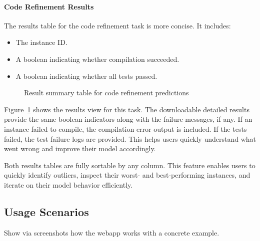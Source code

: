 \paragraph{Code Refinement Results}

The results table for the code refinement task is more concise. It includes:
\begin{itemize}
    \item The instance ID.
    \item A boolean indicating whether compilation succeeded.
    \item A boolean indicating whether all tests passed.
\end{itemize}

\begin{figure}[H]
    \centering
    \caption{Result summary table for code refinement predictions}
    \label{fig:refinement-table}
\end{figure}

Figure~\ref{fig:refinement-table} shows the results view for this task. The downloadable detailed
results provide the same boolean indicators along with the failure messages, if any. If an instance
failed to compile, the compilation error output is included. If the tests failed, the test failure
logs are provided. This helps users quickly understand what went wrong and improve their model
accordingly.

Both results tables are fully sortable by any column. This feature enables users to quickly identify
outliers, inspect their worst- and best-performing instances, and iterate on their model behavior
efficiently.


\subsection{Usage Scenarios}

{\color{gray} Show via screenshots how the webapp works with a concrete example.}
\label{sec:refinement} %
\label{sec:paraphrases-check} %
